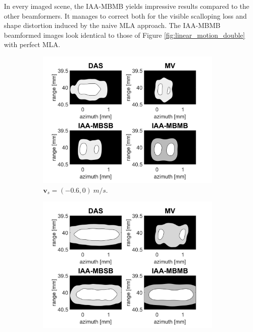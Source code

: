 In every imaged scene, the IAA-MBMB yields impressive results compared to the other beamformers.
It manages to correct both for the visible scalloping loss and shape distortion induced by the naive MLA approach.
The IAA-MBMB beamformed images look identical to those of Figure \ref{fig:linear_motion_double} with perfect MLA.


\begin{figure}[ht]
    \centering
    \begin{subfigure}[t]{0.48\linewidth}
        \includegraphics[width=\linewidth]{./images/results/4/motion_0_-06.png}
        \caption{$\boldsymbol{v}_s = (-0.6, 0)~m/s$.}
        \label{fig:mla_a}
    \end{subfigure}
    \quad
    \begin{subfigure}[t]{0.48\linewidth}
        \includegraphics[width=\linewidth]{./images/results/4/motion_0_06.png}

\end{subfigure}
\end{figure}
